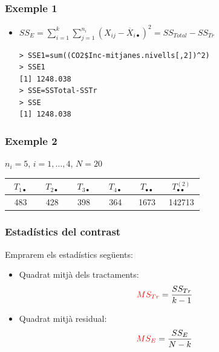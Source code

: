 \documentclass[12pt,t]{beamer}
\newcommand{\red}[1]{\textcolor{red}{#1}}
\renewcommand{\emph}[1]{{\color{red}#1}}
\theoremstyle{plain}
\theoremstyle{definition}
\begin{document}
\begin{frame}[fragile]
\frametitle{Exemple 1}
\begin{itemize}
\item  $SS_E=\sum\limits_{i=1}^k\sum\limits_{j=1}^{n_i} (X_{ij}-\overline{X}_{i\bullet})^2=SS_{Total}-SS_{Tr}$
\medskip

\hspace*{-3ex}\begin{minipage}{\textwidth}
\begin{verbatim}
> SSE1=sum((CO2$Inc-mitjanes.nivells[,2])^2)
> SSE1
[1] 1248.038
> SSE=SSTotal-SSTr
> SSE
[1] 1248.038
\end{verbatim}
\end{minipage}
\end{itemize}
\end{frame}


\begin{frame}
\frametitle{Exemple 2}
$n_i=5$, $i=1,\ldots,4$, $N=20$
\medskip

\begin{center}
\begin{tabular}{c|c|c|c|c|c}
\ ${T_{1\bullet}}$\ {} & \ ${T_{2\bullet}}$\ {} & \ ${T_{3\bullet}}$\ {} & \ ${T_{4\bullet}}$\ {} & \ $T_{\bullet\bullet}$\ {} & \ $T_{\bullet\bullet}^{(2)}$\ {} \\
\hline
483 &
428 &
398 &
364 &
1673 &
142713
\end{tabular}
\end{center}
\medskip

\end{frame}





\begin{frame}
\frametitle{Estadístics del contrast}

Emprarem els estadístics següents:
\begin{itemize}
\item \emph{Quadrat mitjà dels tractaments}:
$$
\red{MS_{Tr}}=\frac{SS_{Tr}}{k-1}
$$
\item \emph{Quadrat mitjà residual}:
$$
\red{MS_E}=\frac{SS_E}{N-k}
$$
\end{itemize}
\end{frame}
\end{document}
